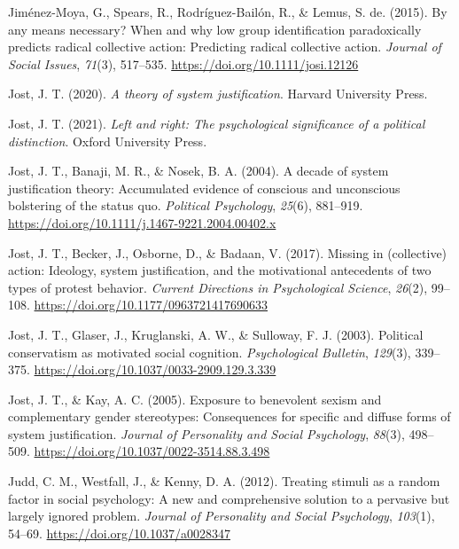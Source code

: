 \documentclass[12pt, letterpaper]{article}
\newenvironment{CSLReferences}[2]{}{}
\begin{document}
\begin{CSLReferences}{1}{0}
\leavevmode{}%
Jiménez-Moya, G., Spears, R., Rodríguez-Bailón, R., \& Lemus, S. de.
(2015). By any means necessary? {When} and why low group identification
paradoxically predicts radical collective action: Predicting radical
collective action. \emph{Journal of Social Issues}, \emph{71}(3),
517--535. \url{https://doi.org/10.1111/josi.12126}

\leavevmode{}%
Jost, J. T. (2020). \emph{A theory of system justification}. Harvard
University Press.

\leavevmode{}%
Jost, J. T. (2021). \emph{Left and right: The psychological significance
of a political distinction}. Oxford University Press.

\leavevmode{}%
Jost, J. T., Banaji, M. R., \& Nosek, B. A. (2004). A decade of system
justification theory: Accumulated evidence of conscious and unconscious
bolstering of the status quo. \emph{Political Psychology}, \emph{25}(6),
881--919. \url{https://doi.org/10.1111/j.1467-9221.2004.00402.x}

\leavevmode{}%
Jost, J. T., Becker, J., Osborne, D., \& Badaan, V. (2017). Missing in
(collective) action: Ideology, system justification, and the
motivational antecedents of two types of protest behavior. \emph{Current
Directions in Psychological Science}, \emph{26}(2), 99--108.
\url{https://doi.org/10.1177/0963721417690633}

\leavevmode{}%
Jost, J. T., Glaser, J., Kruglanski, A. W., \& Sulloway, F. J. (2003).
Political conservatism as motivated social cognition.
\emph{Psychological Bulletin}, \emph{129}(3), 339--375.
\url{https://doi.org/10.1037/0033-2909.129.3.339}

\leavevmode{}%
Jost, J. T., \& Kay, A. C. (2005). Exposure to benevolent sexism and
complementary gender stereotypes: Consequences for specific and diffuse
forms of system justification. \emph{Journal of Personality and Social
Psychology}, \emph{88}(3), 498--509.
\url{https://doi.org/10.1037/0022-3514.88.3.498}

\leavevmode{}%
Judd, C. M., Westfall, J., \& Kenny, D. A. (2012). Treating stimuli as a
random factor in social psychology: {A} new and comprehensive solution
to a pervasive but largely ignored problem. \emph{Journal of Personality
and Social Psychology}, \emph{103}(1), 54--69.
\url{https://doi.org/10.1037/a0028347}


\end{CSLReferences}
\end{document}
